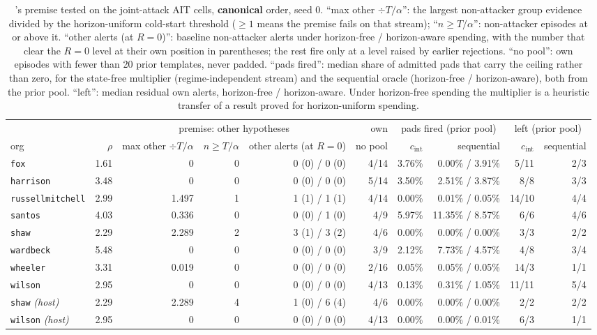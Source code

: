 \begin{table}[t]
\centering
\caption{'s premise tested on the joint-attack AIT cells, \textbf{canonical} order,
seed 0. ``max other $\div T/\alpha$'': the largest non-attacker group evidence divided by the
horizon-uniform cold-start threshold ($\ge1$ means the premise fails on that stream); ``$n\ge T/\alpha$'':
non-attacker episodes at or above it. ``other alerts (at $R{=}0$)'': baseline non-attacker alerts under
horizon-free / horizon-aware spending, with the number that clear the $R=0$ level at their own position
in parentheses; the rest fire only at a level raised by earlier rejections. ``no pool'': own episodes with
fewer than 20 prior templates, never padded. ``pads fired'': median share of admitted pads that carry the
ceiling rather than zero, for the state-free multiplier (regime-independent stream) and the sequential
oracle (horizon-free / horizon-aware), both from the prior pool. ``left'': median residual own alerts,
horizon-free / horizon-aware. Under horizon-free spending the multiplier is a heuristic transfer of a
result proved for horizon-uniform spending.}
\label{apptab:cor2diag}
\footnotesize
\setlength{\tabcolsep}{3.5pt}
\begin{tabular}{lrrrrrrrrr}
\toprule
& & \multicolumn{3}{c}{premise: other hypotheses} & own & \multicolumn{2}{c}{pads fired (prior pool)} & \multicolumn{2}{c}{left (prior pool)} \\
\cmidrule(lr){3-5}\cmidrule(lr){7-8}\cmidrule(lr){9-10}
org & $\rho$ & max other $\div T/\alpha$ & $n\ge T/\alpha$ & other alerts (at $R{=}0$) & no pool & $c_{\mathrm{int}}$ & sequential & $c_{\mathrm{int}}$ & sequential \\
\midrule
\texttt{fox} & 1.61 & 0 & 0 & 0 (0) / 0 (0) & 4/14 & 3.76\% & 0.00\% / 3.91\% & 5/11 & 2/3 \\
\texttt{harrison} & 3.48 & 0 & 0 & 0 (0) / 0 (0) & 5/14 & 3.50\% & 2.51\% / 3.87\% & 8/8 & 3/3 \\
\texttt{russellmitchell} & 2.99 & 1.497 & 1 & 1 (1) / 1 (1) & 4/14 & 0.00\% & 0.01\% / 0.05\% & 14/10 & 4/4 \\
\texttt{santos} & 4.03 & 0.336 & 0 & 0 (0) / 1 (0) & 4/9 & 5.97\% & 11.35\% / 8.57\% & 6/6 & 4/6 \\
\texttt{shaw} & 2.29 & 2.289 & 2 & 3 (1) / 3 (2) & 4/6 & 0.00\% & 0.00\% / 0.00\% & 3/3 & 2/2 \\
\texttt{wardbeck} & 5.48 & 0 & 0 & 0 (0) / 0 (0) & 3/9 & 2.12\% & 7.73\% / 4.57\% & 4/8 & 3/4 \\
\texttt{wheeler} & 3.31 & 0.019 & 0 & 0 (0) / 0 (0) & 2/16 & 0.05\% & 0.05\% / 0.05\% & 14/3 & 1/1 \\
\texttt{wilson} & 2.95 & 0 & 0 & 0 (0) / 0 (0) & 4/13 & 0.13\% & 0.31\% / 1.05\% & 11/11 & 5/4 \\
\texttt{shaw} \emph{(host)} & 2.29 & 2.289 & 4 & 1 (0) / 6 (4) & 4/6 & 0.00\% & 0.00\% / 0.00\% & 2/2 & 2/2 \\
\texttt{wilson} \emph{(host)} & 2.95 & 0 & 0 & 0 (0) / 0 (0) & 4/13 & 0.00\% & 0.00\% / 0.01\% & 6/3 & 1/1 \\
\bottomrule
\end{tabular}
\end{table}
